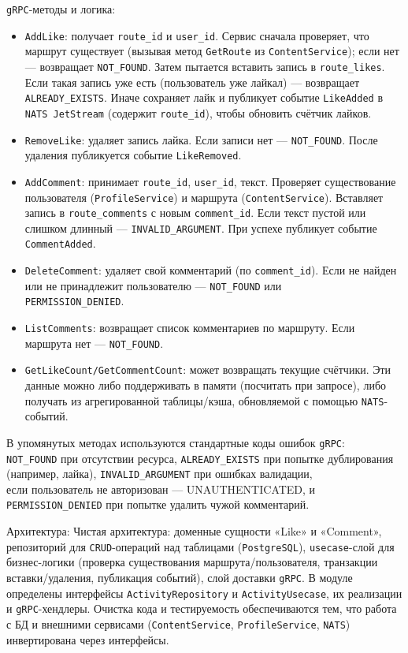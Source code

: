 \texttt{gRPC}-методы и логика:
\begin{itemize}
    \item \texttt{AddLike}: получает \texttt{route\_id} и \texttt{user\_id}. Сервис сначала проверяет, что маршрут существует (вызывая метод \texttt{GetRoute} из \texttt{ContentService}); если нет — возвращает \texttt{NOT\_FOUND}. Затем пытается вставить запись в \texttt{route\_likes}. Если такая запись уже есть (пользователь уже лайкал) — возвращает \texttt{ALREADY\_EXISTS}. Иначе сохраняет лайк и публикует событие \texttt{LikeAdded} в \texttt{NATS JetStream} (содержит \texttt{route\_id}), чтобы обновить счётчик лайков.
    \item \texttt{RemoveLike}: удаляет запись лайка. Если записи нет — \texttt{NOT\_FOUND}. После удаления публикуется событие \texttt{LikeRemoved}.
    \item \texttt{AddComment}: принимает \texttt{route\_id}, \texttt{user\_id}, текст. Проверяет существование пользователя (\texttt{ProfileService}) и маршрута (\texttt{ContentService}). Вставляет запись в \texttt{route\_comments} с новым \texttt{comment\_id}. Если текст пустой или слишком длинный — \texttt{INVALID\_ARGUMENT}. При успехе публикует событие \texttt{CommentAdded}.
    \item \texttt{DeleteComment}: удаляет свой комментарий (по \texttt{comment\_id}). Если не найден или не принадлежит пользователю — \texttt{NOT\_FOUND} или \\ \texttt{PERMISSION\_DENIED}.
    \item \texttt{ListComments}: возвращает список комментариев по маршруту. Если маршрута нет — \texttt{NOT\_FOUND}.
    \item \texttt{GetLikeCount/GetCommentCount}: может возвращать текущие счётчики. Эти данные можно либо поддерживать в памяти (посчитать при запросе), либо получать из агрегированной таблицы/кэша, обновляемой с помощью \texttt{NATS}-событий.
\end{itemize}
\noindent В упомянутых методах используются стандартные коды ошибок \texttt{gRPC}: \\ \texttt{NOT\_FOUND} при отсутствии ресурса, \texttt{ALREADY\_EXISTS} при попытке дублирования (например, лайка), \texttt{INVALID\_ARGUMENT} при ошибках валидации, \\ если пользователь не авторизован — UNAUTHENTICATED,  и \texttt{PERMISSION\_DENIED} при попытке удалить чужой комментарий.

Архитектура: Чистая архитектура: доменные сущности «Like» и «Comment», репозиторий для \texttt{CRUD}-операций над таблицами (\texttt{PostgreSQL}), \texttt{usecase}-слой для бизнес-логики (проверка существования маршрута/пользователя, транзакции вставки/удаления, публикация событий), слой доставки \texttt{gRPC}. В модуле определены интерфейсы \texttt{ActivityRepository} и \texttt{ActivityUsecase}, их реализации и \texttt{gRPC}-хендлеры. Очистка кода и тестируемость обеспечиваются тем, что работа с БД и внешними сервисами (\texttt{ContentService}, \texttt{ProfileService}, \texttt{NATS}) инвертирована через интерфейсы.

